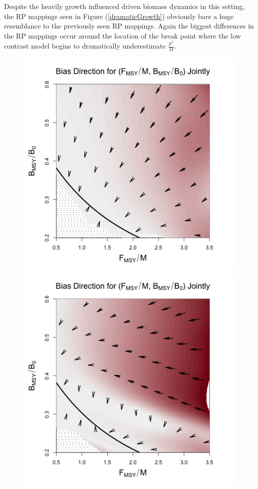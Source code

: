 %
Despite the heavily growth influenced driven biomass dynamics in this setting, 
the RP mappings seen in Figure (\ref{dramaticGrowth}) obviously bare a huge 
resemblance to the previously seen RP mappings. Again the biggest differences 
in the RP mappings occur around the location of the break point where the low 
contrast model begins to dramatically underestimate $\frac{F^*}{M}$.
\begin{figure}[h!]
\begin{minipage}[h!]{0.44\textwidth}
\includegraphics[width=\textwidth]{../ddBias/directionalBiasDDSubExpT45N150A0-1AS2K0.1.png}
\end{minipage}
\begin{minipage}[h!]{0.44\textwidth}
\includegraphics[width=\textwidth]{../ddBias/directionalBiasDDSubFlatT45N150A0-1AS2K0.1N84Edge.png}

\end{minipage}
\end{figure}
